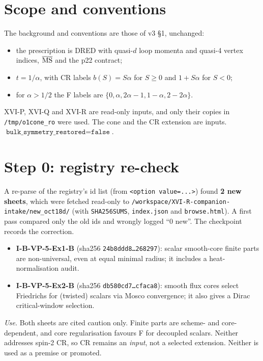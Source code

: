 \section{Scope and conventions}
The background and conventions are those of v3 \S1, unchanged:
\begin{itemize}
\item the prescription is DRED with quasi-$d$ loop momenta and quasi-4 vertex indices, $\overline{\rm MS}$ and the p22 contract;
\item $t=1/\alpha$, with CR labels $b(S)=S\alpha$ for $S\ge0$ and $1+S\alpha$ for $S<0$;
\item for $\alpha>1/2$ the F labels are $\{0,\alpha,2\alpha-1,1-\alpha,2-2\alpha\}$.
\end{itemize}
XVI-P, XVI-Q and XVI-R are read-only inputs, and only their copies in \texttt{/tmp/o1cone\_ro} were used. The cone and the CR extension are inputs. $\texttt{bulk\_symmetry\_restored}=\texttt{false}$.

\section{Step 0: registry re-check}\label{sec:intake}
A re-parse of the registry's id list (from \texttt{<option value=...>}) found \textbf{2 new sheets}, which were fetched read-only to \texttt{/workspace/XVI-R-companion-intake/new\_oct18d/} (with \texttt{SHA256SUMS}, \texttt{index.json} and \texttt{browse.html}). A first pass compared only the old ids and wrongly logged ``0 new''. The checkpoint records the correction.
\begin{itemize}
\item \textbf{I-B-VP-5-Ex1-B} (sha256 \texttt{24b8ddd8\dots 268297}): scalar smooth-core finite parts are non-universal, even at equal minimal radius; it includes a heat-normalisation audit.
\item \textbf{I-B-VP-5-Ex2-B} (sha256 \texttt{db580cd7\dots cfaca8}): smooth flux cores select Friedrichs for (twisted) scalars via Mosco convergence; it also gives a Dirac critical-window selection.
\end{itemize}
\emph{Use.} Both sheets are cited caution only. Finite parts are scheme- and core-dependent, and core regularisation favours F for decoupled scalars. Neither addresses spin-2 CR, so CR remains an \emph{input}, not a selected extension. Neither is used as a premise or promoted.

